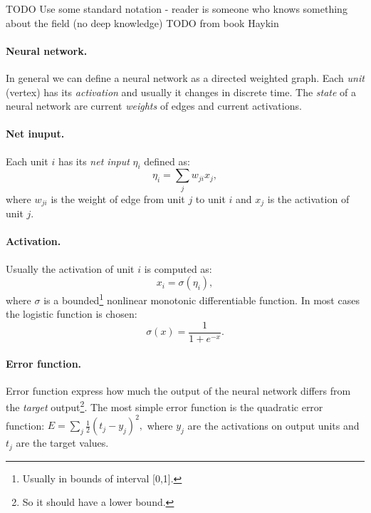 
\newcommand{\argmin}{\operatornamewithlimits{arg\,min}}
\newcommand{\Bx}{{\bf x}}
\newcommand{\By}{{\bf y}}
\newcommand{\Bh}{{\bf h}}
\newcommand{\Bw}{{\bf w}}
\newcommand{\Bc}{{\bf c}}

TODO Use some standard notation - reader is someone who knows something about the field (no deep knowledge) 
TODO from book Haykin 

\paragraph{Neural network.}

In general we can define a neural network as a directed weighted graph. Each \emph{unit} (vertex) has its \emph{activation} and usually it changes in discrete time. The \emph{state} of a neural network are current \emph{weights} of edges and current activations. 

\paragraph{Net inuput.}
Each unit $i$ has its \emph{net input} $\eta_i$ defined as:
$$\eta_i = \sum_j w_{ji}x_j,$$
where $w_{ji}$ is the weight of edge from unit $j$ to unit $i$ and $x_j$ is the activation of unit $j$.

\paragraph{Activation.}
Usually the activation of unit $i$ is computed as:
$$x_i = \sigma(\eta_i),$$
where $\sigma$ is a bounded\footnote{
Usually in bounds of interval [0,1].
} nonlinear monotonic differentiable function. In most cases the logistic function is chosen:
$$\sigma(x) = \frac{1}{1 + e^{-x}}.$$

\paragraph{Error function.}
Error function express how much the output of the neural network differs from the \emph{target} output\footnote{
So it should have a lower bound. 
}. The most simple error function is the quadratic error function:
$E = \sum_j \frac{1}{2}(t_j-y_j)^2,$
where $y_j$ are the activations on output units and $t_j$ are the target values.

